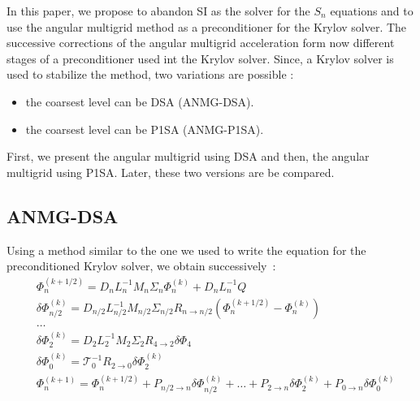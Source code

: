 \documentclass[preprint,10pt]{elsarticle}
\renewcommand{\(}{\left(}
\renewcommand{\)}{\right)}
\renewcommand{\[}{\left[}
\renewcommand{\]}{\right]}
\begin{document}
In this paper, we propose to abandon SI as the solver for the $S_n$ equations 
and to use the angular multigrid method as a preconditioner for the Krylov solver. 
The successive corrections of the angular multigrid acceleration form
now different stages of a preconditioner used int the Krylov solver. Since, a Krylov solver is used to
stabilize the method, two variations are possible :
\begin{itemize}
\item the coarsest level can be DSA (ANMG-DSA).
\item the coarsest level can be P1SA (ANMG-P1SA).
\end{itemize}
First, we present the angular multigrid using DSA and then, the angular
multigrid using P1SA. Later, these two versions are be compared.

\subsection{ANMG-DSA}

Using a method similar to the one we used to write the equation for the 
preconditioned Krylov solver, we obtain \hbox{successively :}
\begin{align}
& \Phi_n^{(k+1/2)} = D_n L_n^{-1} M_n \Sigma_n \Phi_n^{(k)} + D_n L_n^{-1} Q\\
& \delta \Phi_{n/2}^{(k)} = D_{n/2} L_{n/2}^{-1} M_{n/2} \Sigma_{n/2}
R_{n\rightarrow n/2} \(\Phi_n^{(k+1/2)}-\Phi_n^{(k)}\)\\
& \hdots\\
& \delta \Phi_2^{(k)} = D_2 L_2^{-1} M_2 \Sigma_2 R_{4\rightarrow 2} \delta \Phi_4\\
& \delta \Phi_0^{(k)} = \mathcal{T}_0^{-1} R_{2\rightarrow 0} \delta \Phi_2^{(k)} \\
& \Phi_n^{(k+1)} = \Phi_n^{(k+1/2)} + P_{n/2 \rightarrow n} \delta
\Phi_{n/2}^{(k)} + \hdots + P_{2 \rightarrow n} \delta \Phi_{2}^{(k)} + P_{0
\rightarrow n} \delta \Phi_{0}^{(k)}
\end{align}
\end{document}
